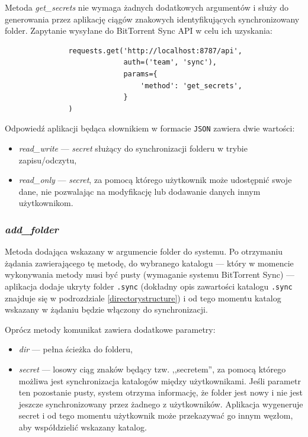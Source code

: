 \label{getsecrets}

Metoda \emph{get\_secrets} nie wymaga żadnych dodatkowych argumentów i służy do generowania przez aplikację ciągów znakowych identyfikujących synchronizowany folder.  Zapytanie wysyłane do BitTorrent Sync API w celu ich uzyskania:

\begin{minipage}{\linewidth}
\vspace{15pt}
\begin{verbatim}
               requests.get('http://localhost:8787/api',
                            auth=('team', 'sync'),
                            params={
                                'method': 'get_secrets',
                            }
               )
\end{verbatim}
\vspace{15pt}
\end{minipage}

Odpowiedź aplikacji będąca słownikiem w formacie \texttt{JSON} \cite{jsonarticle} zawiera dwie wartości:

\begin{itemize}[noitemsep]
  \item \emph{read\_write} --- \emph{secret} służący do synchronizacji folderu w trybie zapisu/odczytu,
  \item \emph{read\_only} --- \emph{secret}, za pomocą którego użytkownik może udostępnić swoje dane, nie pozwalając na modyfikację lub dodawanie danych innym użytkownikom.
\end{itemize}

\subsubsection*{\emph{add\_folder}}

Metoda dodająca wskazany w argumencie folder do systemu. Po otrzymaniu żądania zawierającego tę metodę, do wybranego katalogu --- który w momencie wykonywania metody musi być pusty (wymaganie systemu BitTorrent Sync) --- aplikacja dodaje ukryty folder \texttt{.sync} (dokładny opis zawartości katalogu \texttt{.sync} znajduje się w podrozdziale \ref{directorystructure}) i od tego momentu katalog wskazany w żądaniu będzie włączony do synchronizacji.

Oprócz metody komunikat zawiera dodatkowe parametry:

\begin{itemize}[noitemsep]
  \item \emph{dir} --- pełna ścieżka do folderu,
  \item \emph{secret} --- losowy ciąg znaków będący tzw. ,,secretem'', za pomocą którego możliwa jest synchronizacja katalogów między użytkownikami. Jeśli parametr ten pozostanie pusty, system otrzyma informację, że folder jest nowy i nie jest jeszcze synchronizowany przez żadnego z użytkowników. Aplikacja wygeneruje secret i od tego momentu użytkownik może przekazywać go innym węzłom, aby współdzielić wskazany katalog.
\end{itemize}

